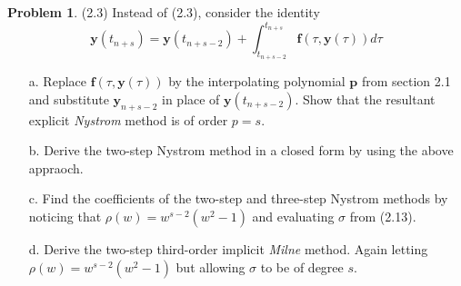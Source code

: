 \documentclass[a4paper, 10pt]{article}
\theoremstyle{definition}
\newtheorem{problem}{Problem}
\theoremstyle{hSol}
\begin{document}
\begin{problem} (2.3) Instead of (2.3), consider the identity
$$
\bm{y}(t_{n+s}) = \bm{y}(t_{n+s-2}) + \int_{t_{n+s-2}}^{t_{n+s}} \bm{f}(\tau ,\bm{y}(\tau)) d\tau
$$
\begin{itemize}
  \item[a.] Replace $\bm{f}(\tau, \bm{y}(\tau))$ by the interpolating polynomial $\bm{p}$ from section 2.1 and substitute $\bm{y}_{n+s-2}$ in place of $\bm{y}(t_{n+s-2})$. Show that the resultant explicit \emph{Nystrom} method is of order $p=s$.
  \item[b.] Derive the two-step Nystrom method in a closed form by using the above appraoch.
  \item[c.] Find the coefficients of the two-step and three-step Nystrom methods by noticing that $\rho(w) = w^{s-2} (w^2 - 1)$ and evaluating $\sigma$ from (2.13).
  \item[d.] Derive the two-step third-order implicit \emph{Milne} method. Again letting $\rho(w) = w^{s-2} (w^2 - 1)$ but allowing $\sigma$ to be of degree $s$.
\end{itemize}
\end{problem}
\end{document}
